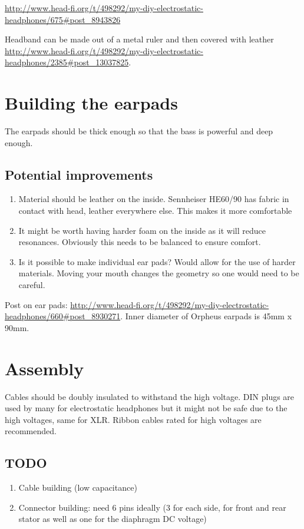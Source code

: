 \documentclass{article}
\begin{document}
\url{http://www.head-fi.org/t/498292/my-diy-electrostatic-headphones/675#post_8943826}

Headband can be made out of a metal ruler and then covered with leather \url{http://www.head-fi.org/t/498292/my-diy-electrostatic-headphones/2385#post_13037825}.

\section{Building the earpads}
The earpads should be thick enough so that the bass is powerful and deep enough.
\label{s:pads}
\subsection{Potential improvements}
\begin{enumerate}
    \item Material should be leather on the inside. Sennheiser HE60/90 has fabric in contact with head, leather everywhere else. This makes it more comfortable
    \item It might be worth having harder foam on the inside as it will reduce resonances. Obviously this needs to be balanced to ensure comfort.
    \item Is it possible to make individual ear pads? Would allow for the use of harder materials. Moving your mouth changes the geometry so one would need to be careful.
\end{enumerate}
Post on ear pads: \url{http://www.head-fi.org/t/498292/my-diy-electrostatic-headphones/660#post_8930271}. Inner diameter of Orpheus earpads is 45mm x 90mm.

\section{Assembly}
\label{s:assembly}
Cables should be doubly insulated to withstand the high voltage. DIN plugs are used by many for electrostatic headphones but it might not be safe due to the high voltages, same for XLR. Ribbon cables rated for high voltages are recommended.

\subsection{TODO}
\begin{enumerate}
    \item Cable building (low capacitance)
    \item Connector building: need 6 pins ideally (3 for each side, for front and rear stator as well as one for the diaphragm DC voltage)
\end{enumerate}
\end{document}
